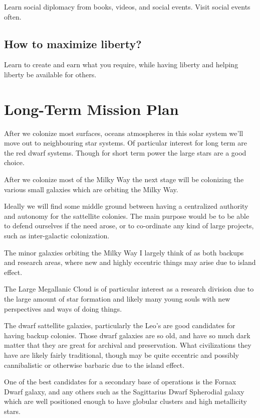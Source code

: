 \documentclass{report}
\begin{document}
Learn social diplomacy from books, videos, and social events.
Visit social events often.

\subsection{How to maximize liberty?}

Learn to create and earn what you require,
while having liberty and helping liberty be available for others.


\section{Long-Term Mission Plan}\label{intergalacticmission}

After we colonize most surfaces, oceans atmospheres in this solar system we'll
move out to neighbouring star systems.  Of particular interest for long term are
the red dwarf systems.  Though for short term power the large stars are a good
choice. 

After we colonize most of the Milky Way the next stage will be colonizing the
various small galaxies which are orbiting the Milky Way. 

Ideally we will find some middle ground between having a centralized authority
and autonomy for the sattellite colonies.  The main purpose would be to be able
to defend ourselves if the need arose, or to co-ordinate any kind of large
projects, such as inter-galactic colonization.

The minor galaxies orbiting the Milky Way I largely think of as both backups and
research areas, where new and highly eccentric things may arise due to island
effect. 

The Large Megallanic Cloud is of particular interest as a research
division due to the large amount of star formation and likely many young souls
with new perspectives and ways of doing things. 

The dwarf sattellite galaxies, particularly the Leo's are good candidates for 
having backup colonies. Those dwarf galaxies are so old, and have so much dark
matter that they are great for archival and preservation. What civilizations
they have are likely fairly traditional, though may be quite eccentric and
possibly cannibalistic or otherwise barbaric due to the island effect. 

One of the best candidates for a secondary base of operations is the Fornax
Dwarf galaxy, and any others such as the Sagittarius Dwarf Spherodial galaxy 
which are well positioned enough to have globular clusters and 
high metallicity stars.
\end{document}
